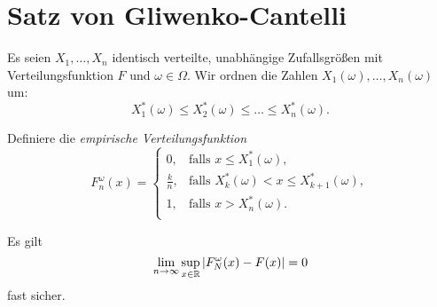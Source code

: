 \section{Satz von Gliwenko-Cantelli}
\begin{defn}
  Es seien $X_1, \ldots, X_n$ identisch verteilte, unabhängige Zufallsgrößen mit
  Verteilungsfunktion $F$ und $\omega \in \Omega$. Wir ordnen die Zahlen
  $X_1(\omega), \ldots, X_n(\omega)$ um:
  \[ X_1^*(\omega) \le X_2^*(\omega) \le \ldots \le X_n^*(\omega). \]

  Definiere die \emph{empirische Verteilungsfunktion}
  \[ F_n^\omega(x) =
    \begin{cases}
      0, & \text{falls } x \le X_1^*(\omega), \\
      \frac{k}{n}, & \text{falls } X_k^*(\omega) < x \le X_{k+1}^*(\omega), \\
      1, & \text{falls } x > X_n^*(\omega). \\
    \end{cases}
  \]
\end{defn}

\begin{thm}
  Es gilt
  \[ \lim_{n \to \infty} \sup_{x \in \mathbb{R}} | F_N^\omega(x) - F(x) | = 0 \]
  fast sicher.
\end{thm}


